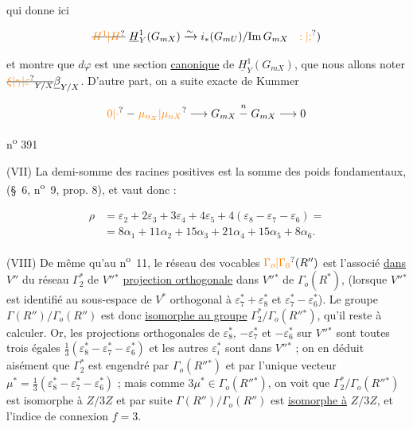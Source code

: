 
qui donne ici

\[
\deleted{\unsure{H^1|H}}\ \underline H^1_Y(G_{mX})\xrightarrow{\sim}i_*(G_{mU})/\mathrm{Im}\,G_{mX}\quad \unsure{:|;})
\]

et montre que $d\varphi$ est une section \uline{canonique} de $\underline H^1_Y(G_{mX})$, que nous allons noter $\deleted{\unsure{\xi|\gamma|\varepsilon}_{Y/X}}\underline\beta_{Y/X}$. D'autre part, on a  suite exacte de Kummer

\[
\unsure{0|\cdot}\mathrel{-}\unsure{\mu_{n_X}|\mu_{nX}}\longrightarrow G_{mX}\overset{n}{\mathrel{-}} G_{mX}\longrightarrow 0
\]

\hfill n\textsuperscript{o} 391

(VII) La demi-somme des racines positives est la somme des poids fondamentaux, (\S~6, n\textsuperscript{o}~9, prop. 8), et vaut donc :

\[
\begin{aligned}
\rho&=\varepsilon_2+2\varepsilon_3+3\varepsilon_4+4\varepsilon_5+4(\varepsilon_8-\varepsilon_7-\varepsilon_6)=\\
&=8\alpha_1+11\alpha_2+15\alpha_3+21\alpha_4+15\alpha_5+8\alpha_6.
\end{aligned}
\]

(VIII) De même qu'au n\textsuperscript{o}~11, le réseau des vocables $\unsure{\Gamma_o|\Gamma_0}(R'')$ est l'associé \uline{dans} $V''$ du réseau $\Gamma_2^*$ de $V''{}^*$ \uline{projection orthogonale} dans $V''{}^*$ de $\Gamma_o(R^*)$, (lorsque $V''{}^*$ est identifié au sous-espace de $V^*$ orthogonal à $\varepsilon_7^*+\varepsilon_8^*$ et $\varepsilon_7^*-\varepsilon_6^*$). Le groupe $\Gamma(R'')/\Gamma_o(R'')$ est donc \uline{isomorphe au groupe} $\Gamma_2^*/\Gamma_o(R''{}^*)$, qu'il reste à calculer. Or, les projections orthogonales de $\varepsilon_8^*$, $-\varepsilon_7^*$ et $-\varepsilon_6^*$ sur $V''{}^*$ sont toutes trois égales $\frac{1}{3}(\varepsilon_8^*-\varepsilon_7^*-\varepsilon_6^*)$ et les autres $\varepsilon_i^*$ sont dans $V''{}^*$ ; on en déduit aisément que $\Gamma_2^*$ est engendré par $\Gamma_o(R''{}^*)$ et par l'unique vecteur $\mu^*=\frac{1}{3}(\varepsilon_8^*-\varepsilon_7^*-\varepsilon_6^*)$ ; mais comme $3\mu^*\in\Gamma_o(R''{}^*)$, on voit que $\Gamma_2^*/\Gamma_o(R''{}^*)$ est isomorphe à $Z/3Z$ et par suite $\Gamma(R'')/\Gamma_o(R'')$ est \uline{isomorphe à} $Z/3Z$, et l'indice de connexion $f=3$.

